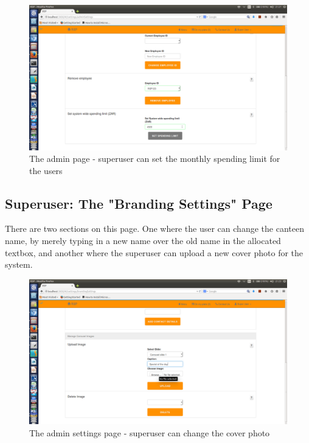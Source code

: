 \documentclass[a4paper,12pt]{article}
\begin{document}
\begin{figure}[H]
  \centering
    \includegraphics[width=1.0\textwidth]{screenshots/setLimit.png}
    \caption{The admin page - superuser can set the monthly spending limit for the users} 
\end{figure}

\subsection{Superuser: The "Branding Settings" Page} 
There are two sections on this page. One where the user can change the canteen name, by merely typing in a new name over the old name in the allocated textbox, and another where the superuser can upload a new cover photo for the system.

\begin{figure}[H]
  \centering
    \includegraphics[width=1.0\textwidth]{screenshots/coverImage.png}
    \caption{The admin settings page - superuser can change the cover photo} 
\end{figure}
\end{document}
